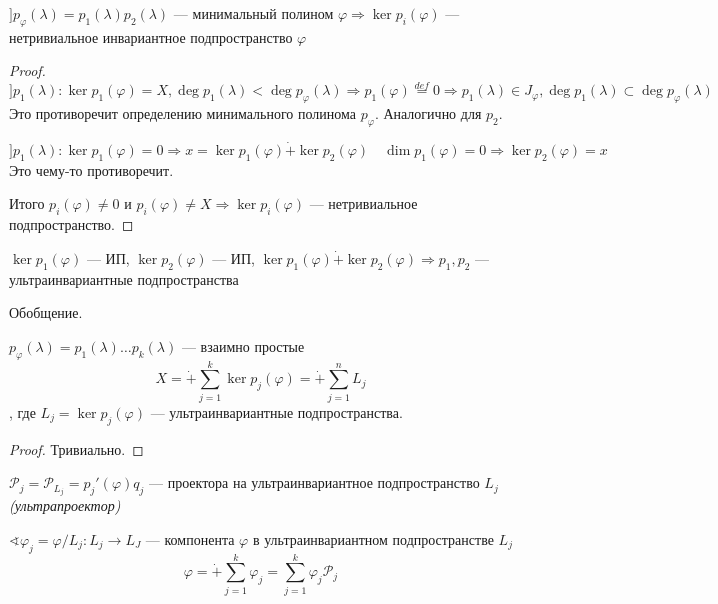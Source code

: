 \begin{lemma}
    $] p_\varphi(\lambda)=p_1(\lambda)p_2(\lambda)$ --- минимальный полином $\varphi \Rightarrow \ker p_i(\varphi)$ --- нетривиальное инвариантное подпространство $\varphi$
\end{lemma}
\begin{proof}
    $$] p_1(\lambda) : \ker p_1(\varphi) = X, \deg p_1(\lambda) < \deg p_\varphi(\lambda) \Rightarrow p_1(\varphi)\stackrel{def}{=}0 \Rightarrow p_1(\lambda)\in J_\varphi, \deg p_1(\lambda)\subset \deg p_\varphi(\lambda)$$
    Это противоречит определению минимального полинома $p_\varphi$. Аналогично для $p_2$.

    $$] p_1(\lambda) : \ker p_1(\varphi) = 0 \Rightarrow x = \ker p_1(\varphi)\dot+\ker p_2(\varphi) \quad \dim p_1 (\varphi) = 0 \Rightarrow \ker p_2(\varphi) =x$$
    Это чему-то противоречит.

    Итого $p_i(\varphi)\not=0$ и $p_i(\varphi)\not=X \Rightarrow \ker p_i(\varphi)$  --- нетривиальное подпространство.
\end{proof}

\begin{remark}
    $\ker p_1(\varphi)$ --- ИП, $\ker p_2(\varphi)$ --- ИП, $\ker p_1(\varphi)\dot+\ker p_2(\varphi) \Rightarrow p_1, p_2$ --- ультраинвариантные подпространства
\end{remark}

\begin{theorem}
    Обобщение.

    $p_\varphi(\lambda)=p_1(\lambda)\ldots p_k(\lambda)$ --- взаимно простые
    $$X = \dot + \sum_{j=1}^k \ker p_j(\varphi) = \dot+\sum_{j=1}^n L_j$$
    , где $L_j = \ker p_j (\varphi)$ --- ультраинвариантные подпространства.
\end{theorem}
\begin{proof}
    Тривиально.
\end{proof}

$\mathcal P_j = \mathcal P_{L_j} = p_j'(\varphi) q_j$ --- проектора на ультраинвариантное подпространство $L_j$ \textit{(ультрапроектор)}

$\sphericalangle \varphi_j = \varphi / L_j : L_j\to L_J$ --- компонента $\varphi$ в ультраинвариантном подпространстве $L_j$
$$\varphi=\dot+\sum_{j=1}^k \varphi_j = \sum_{j=1}^k \varphi_j \mathcal P_j$$

